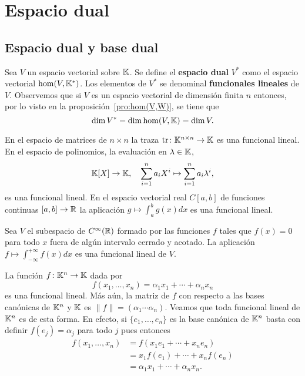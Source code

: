 \chapter{Espacio dual}

\section{Espacio dual y base dual}

\begin{block}
    Sea $V$ un espacio vectorial sobre $\mathbb{K}$. Se define el \textbf{espacio dual}
    $V^*$ como el espacio vectorial $\hom(V,\mathbb{K}^*)$. Los elementos de $V^*$ se
    denominal \textbf{funcionales lineales} de $V$.  Observemos que si $V$ es
    un espacio vectorial de dimensión finita $n$ entonces, por lo visto en la
    proposición~\ref{pro:hom(V,W)}, se tiene que 
    \[ 
        \dim V^*=\dim\hom(V,\mathbb{K})=\dim V.
    \]
\end{block}

\begin{examples}
	En el espacio de matrices de $n\times n$ la traza $\operatorname{tr}\colon \mathbb{K}^{n\times
	n}\to\mathbb{K}$ es una funcional lineal.  En el espacio de polinomios, la
	evaluación en $\lambda\in\mathbb{K}$,
	\[
	\mathbb{K}[X]\to\mathbb{K},\quad
	\sum_{i=1}^n a_iX^i\mapsto\sum_{i=1}^n a_i\lambda^i,
	\]
    es una funcional lineal. En el espacio vectorial real $C[a,b]$ de funciones
    continuas $[a,b]\to\mathbb{R}$ la aplicación $g\mapsto\int_{a}^{b}g(x)dx$ es una
    funcional lineal.
\end{examples}

\begin{example}
    Sea $V$ el subespacio de $C^\infty(\mathbb{R})$ formado por las funciones $f$ tales
    que $f(x)=0$ para todo $x$ fuera de algún intervalo cerrado y acotado.  La
    aplicación $f\mapsto\int_{-\infty}^{+\infty}f(x)dx$ es una funcional lineal
    de $V$.
\end{example}

\begin{example}
    \label{exa:funcional_lineal}
    La función $f\colon\mathbb{K}^n\to\mathbb{K}$ dada por
    \[
        f(x_1,\dots,x_n)=\alpha_1x_1+\cdots+\alpha_nx_n
    \]
    es una funcional lineal.  Más aún, la matriz de $f$ con respecto a las
    bases canónicas de $\mathbb{K}^n$ y $\mathbb{K}$ es $\|f\|=(\alpha_1\cdots\alpha_n)$.
    Veamos que toda funcional lineal de $\mathbb{K}^n$ es de esta forma. En efecto, si
    $\{e_1,\dots,e_n\}$ es la base canónica de $\mathbb{K}^n$ basta con definir
    $f(e_j)=\alpha_j$ para todo $j$ pues entonces 
    \begin{align*}
        f(x_1,\dots,x_n) &= f(x_1e_1+\cdots+x_ne_n)\\
        &=x_1f(e_1)+\cdots+x_nf(e_n)\\
        &=\alpha_1x_1+\cdots+\alpha_nx_n.
    \end{align*}
\end{example}

